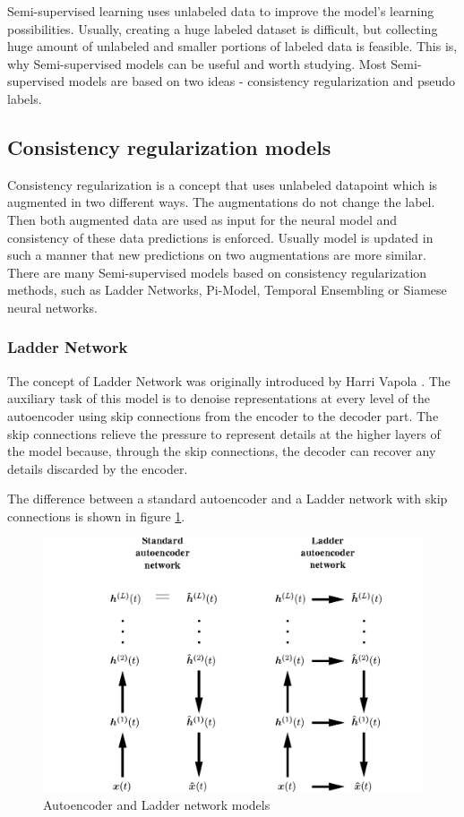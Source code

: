 Semi-supervised learning uses unlabeled data to improve the model's learning possibilities. Usually, creating a huge labeled dataset is difficult, but collecting huge amount of unlabeled and smaller portions of labeled data is feasible. This is, why Semi-supervised models can be useful and worth studying. Most Semi-supervised models are based on two ideas - consistency regularization and pseudo labels. 


\subsection{Consistency regularization models}

Consistency regularization is a concept that uses unlabeled datapoint which is augmented in two different ways. The augmentations do not change the label. Then both augmented data are used as input for the neural model and consistency of these data predictions is enforced. Usually model is updated in such a manner that new predictions on two augmentations are more similar. There are many Semi-supervised models based on consistency regularization methods, such as Ladder Networks, Pi-Model, Temporal Ensembling or Siamese neural networks.

\subsubsection{Ladder Network}

The concept of Ladder Network was originally introduced by Harri Vapola \cite{valpola2015}. 
The auxiliary task of this model is to denoise representations at every level of the autoencoder using skip connections from the encoder to the decoder part. The skip connections relieve the pressure
to represent details at the higher layers of the model because, through the skip connections, the
decoder can recover any details discarded by the encoder. \cite{Rasmus2015} 

The difference between a standard autoencoder and a Ladder network with skip connections is shown in figure \ref{fig:ladder}.

\begin{figure}[h!]
    \centering
    \includegraphics[width=1\textwidth]{figs/ladder.png}
    \caption{Autoencoder and Ladder network models \cite{valpola2015} }
    \label{fig:ladder}
\end{figure}

